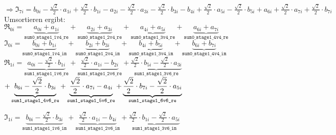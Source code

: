 \indent$\Rightarrow \Im_{7i} = b_{0i} -\frac{\sqrt{2}}{2} \cdot a_{1i} +\frac{\sqrt{2}}{2} \cdot b_{1i} -a_{2i} -\frac{\sqrt{2}}{2} \cdot a_{3i} -\frac{\sqrt{2}}{2} \cdot b_{3i} -b_{4i} +\frac{\sqrt{2}}{2} \cdot a_{5i} -\frac{\sqrt{2}}{2} \cdot b_{5i} +a_{6i} +\frac{\sqrt{2}}{2} \cdot a_{7i} +\frac{\sqrt{2}}{2} \cdot b_{7i}$\\

\vspace{1cm}
Umsortieren ergibt:\\


\vspace{0.5cm}
\noindent$\Re_{0i} = \underbrace{a_{0i} + a_{1i}}_{\texttt{sum0\_stage1\_1v4\_re}} + \underbrace{a_{2i} + a_{3i}}_{\texttt{sum0\_stage1\_2v4\_re}} + \underbrace{a_{4i} + a_{5i}}_{\texttt{sum0\_stage1\_3v4\_re}} + \underbrace{a_{6i} + a_{7i}}_{\texttt{sum0\_stage1\_4v4\_re}}$\\

\vspace{0.5cm}
\noindent$\Im_{0i} = \underbrace{b_{0i} + b_{1i}}_{\texttt{sum0\_stage1\_1v4\_im}} + \underbrace{b_{2i} + b_{3i}}_{\texttt{sum0\_stage1\_2v4\_im}} + \underbrace{b_{4i} + b_{5i}}_{\texttt{sum0\_stage1\_3v4\_im}} + \underbrace{b_{6i} + b_{7i}}_{\texttt{sum0\_stage1\_4v4\_im}}$\\

\vspace{1cm}
\noindent$\Re_{1i} = \underbrace{a_{0i} -\frac{\sqrt{2}}{2} \cdot b_{1i}}_{\texttt{sum1\_stage1\_1v6\_re}} + \underbrace{\frac{\sqrt{2}}{2} \cdot a_{1i} -b_{2i}}_{\texttt{sum1\_stage1\_2v6\_re}} + \underbrace{\frac{\sqrt{2}}{2} \cdot b_{5i} -\frac{\sqrt{2}}{2} \cdot a_{3i}}_{\texttt{sum1\_stage1\_3v6\_re}}$\\ 

\vspace{0.4cm}
\hspace{0.3cm} $+ \underbrace{b_{6i} -\frac{\sqrt{2}}{2} \cdot b_{3i}}_{\texttt{sum1\_stage1\_4v6\_re}} + \underbrace{\frac{\sqrt{2}}{2} \cdot a_{7i} -a_{4i}}_{\texttt{sum1\_stage1\_5v6\_re}} + \underbrace{\frac{\sqrt{2}}{2} \cdot b_{7i}-\frac{\sqrt{2}}{2} \cdot a_{5i}}_{\texttt{sum1\_stage1\_6v6\_re}}\\$

\vspace{0.5cm}
\noindent$\Im_{1i} = \underbrace{b_{0i} -\frac{\sqrt{2}}{2} \cdot b_{3i}}_{\texttt{sum1\_stage1\_1v6\_im}} + \underbrace{\frac{\sqrt{2}}{2} \cdot a_{1i} -b_{4i}}_{\texttt{sum1\_stage1\_2v6\_im}} + \underbrace{\frac{\sqrt{2}}{2} \cdot b_{1i} -\frac{\sqrt{2}}{2} \cdot a_{5i}}_{\texttt{sum1\_stage1\_3v6\_im}}$\\

